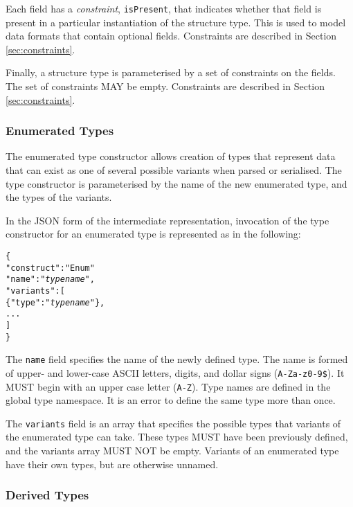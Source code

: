 \documentclass[10pt,twocolumn,a4paper]{article}
\newcommand{\code}[1]{\texttt{#1}}
\begin{document}
Each field has a \emph{constraint}, \code{isPresent}, that indicates
whether that field is present in a particular instantiation of the
structure type. This is used to model data formats that contain optional
fields. Constraints are described in Section \ref{sec:constraints}.

Finally, a structure type is parameterised by a set of constraints on the
fields. The set of constraints MAY be empty. Constraints are described in
Section \ref{sec:constraints}.


\subsubsection{Enumerated Types}

The enumerated type constructor allows creation of types that represent
data that can exist as one of several possible variants when parsed or
serialised. The type constructor is parameterised by the name of the new
enumerated type, and the types of the variants.

In the JSON form of the intermediate representation, invocation of the type
constructor for an enumerated type is represented as in the following:
\footnotesize
\begin{alltt}
  \{
    "construct"   : "Enum"
    "name"        : "\emph{type name}",
    "variants"    : [
      \{"type" : "\emph{type name}"\},
      ...
    ]
  \}
\end{alltt}
\normalsize
The \code{name} field specifies the name of the newly defined type. The
name is formed of upper- and lower-case ASCII letters, digits, and dollar
signs (\code{A-Za-z0-9\$}).  It MUST begin with an upper case letter
(\code{A-Z}). Type names are defined in the global type namespace.
It is an error to define the same type more than once.

The \code{variants} field is an array that specifies the possible types
that variants of the enumerated type can take. These types MUST have been
previously defined, and the variants array MUST NOT be empty. Variants of
an enumerated type have their own types, but are otherwise unnamed.

\subsubsection{Derived Types}
\end{document}
